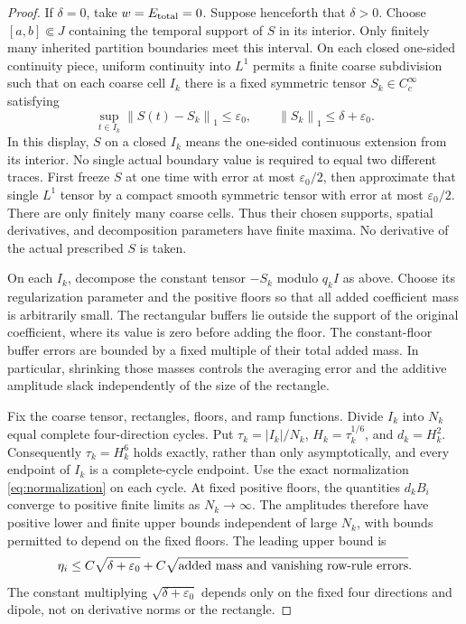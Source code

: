 \documentclass[11pt]{article}
\theoremstyle{remark}\newtheorem{remark}[theorem]{Remark}
\newcommand{\norm}[2]{\left\|#1\right\|_{#2}}
\begin{document}
\begin{proof}
If $\delta=0$, take $w=E_{\rm total}=0$.
Suppose henceforth that $\delta>0$.
Choose $[a,b]\Subset J$ containing the temporal support of $S$ in its interior.
Only finitely many inherited partition boundaries meet this interval.
On each closed one-sided continuity piece, uniform continuity into $L^1$
permits a finite coarse subdivision such that on each coarse cell $I_k$
there is a fixed symmetric tensor $S_k\in C_c^\infty$ satisfying
\begin{equation}\label{eq:coarse-approx}
 \sup_{t\in I_k}\norm{S(t)-S_k}1\leq\varepsilon_0,\qquad
 \norm{S_k}1\leq\delta+\varepsilon_0.
\end{equation}
In this display, $S$ on a closed $I_k$ means the one-sided continuous
extension from its interior.
No single actual boundary value is required to equal two different traces.
First freeze $S$ at one time with error at most $\varepsilon_0/2$, then approximate
that single $L^1$ tensor by a compact smooth symmetric tensor with error
at most $\varepsilon_0/2$.
There are only finitely many coarse cells.
Thus their chosen supports, spatial derivatives, and decomposition parameters
have finite maxima.
No derivative of the actual prescribed $S$ is taken.

On each $I_k$, decompose the constant tensor $-S_k$ modulo $q_kI$
as above.
Choose its regularization parameter and the positive floors so that all
added coefficient mass is arbitrarily small.
The rectangular buffers lie outside the support of the original coefficient,
where its value is zero before adding the floor.
The constant-floor buffer errors are bounded by a fixed multiple of their
total added mass.
In particular, shrinking those masses controls the averaging error and the
additive amplitude slack independently of the size of the rectangle.

Fix the coarse tensor, rectangles, floors, and ramp functions.
Divide $I_k$ into $N_k$ equal complete four-direction cycles.
Put $\tau_k=|I_k|/N_k$, $H_k=\tau_k^{1/6}$, and $d_k=H_k^2$.
Consequently $\tau_k=H_k^6$ holds exactly, rather than only asymptotically,
and every endpoint of $I_k$ is a complete-cycle endpoint.
Use the exact normalization \eqref{eq:normalization} on each cycle.
At fixed positive floors, the quantities $d_kB_i$ converge to positive finite
limits as $N_k\to\infty$.
The amplitudes therefore have positive lower and finite upper bounds
independent of large $N_k$, with bounds permitted to depend on the fixed floors.
The leading upper bound is
\[
 \eta_i\leq C\sqrt{\delta+\varepsilon_0}
   +C\sqrt{\hbox{added mass and vanishing row-rule errors}}.
\]
The constant multiplying $\sqrt{\delta+\varepsilon_0}$ depends only on the fixed
four directions and dipole, not on derivative norms or the rectangle.


\end{proof}
\end{document}
